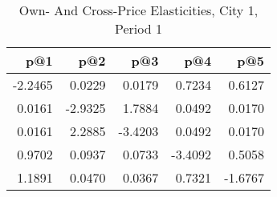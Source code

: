 \begin{table}[htbp]
    \centering
    \caption{Own- And Cross-Price Elasticities, City 1, Period 1}
    \label{tab:q9_elasticities_city1_period1}
\toprule
\begin{tabular}{rrrrr}
\toprule
p@1 & p@2 & p@3 & p@4 & p@5 \\
\midrule
\midrule
-2.2465 & 0.0229 & 0.0179 & 0.7234 & 0.6127 \\
0.0161 & -2.9325 & 1.7884 & 0.0492 & 0.0170 \\
0.0161 & 2.2885 & -3.4203 & 0.0492 & 0.0170 \\
0.9702 & 0.0937 & 0.0733 & -3.4092 & 0.5058 \\
1.1891 & 0.0470 & 0.0367 & 0.7321 & -1.6767 \\
\bottomrule
\bottomrule
\end{tabular}

\end{table}
